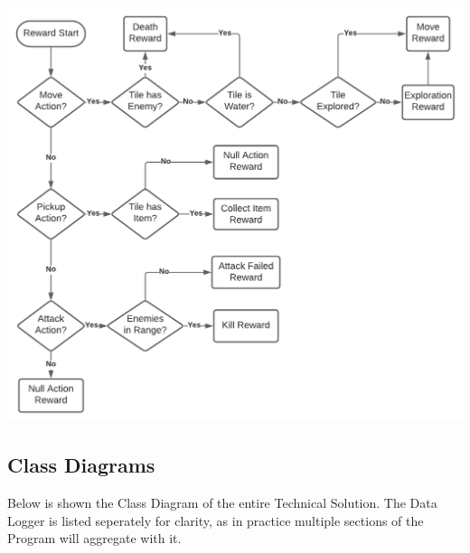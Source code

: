 \begin{flushleft}
            \vspace{0.5cm}
            \centerline{\includegraphics[width=\textwidth]{Images/Design/RewardActionStructure.png}}
            \vspace{0.5cm}

        \subsection{Class Diagrams}
            \large
            \vspace{0.2cm}
            Below is shown the Class Diagram of the entire Technical Solution. The Data Logger is listed seperately for clarity, as
            in practice multiple sections of the Program will aggregate with it. \\


\end{flushleft}
